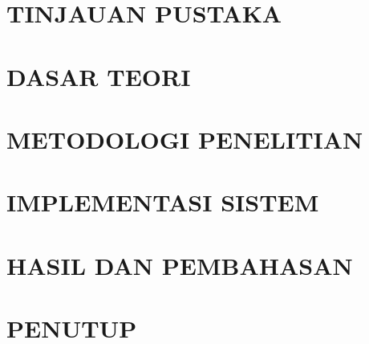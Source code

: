 \documentclass[ugmtesis]{ugmtesis}
\begin{document}
\chapter{TINJAUAN PUSTAKA}
\label{TINJAUAN PUSTAKA}


\chapter{DASAR TEORI}
\label{DASAR TEORI}


\chapter{METODOLOGI PENELITIAN}
\label{ANALISIS DAN PERANCANGAN SISTEM}


\chapter{IMPLEMENTASI SISTEM}
\label{IMPLEMENTASI SISTEM}


\chapter{HASIL DAN PEMBAHASAN}
\label{PENGUJIAN DAN PEMBAHASAN SISTEM}


\chapter{PENUTUP}
\label{PENUTUP}





% 

\end{document}
